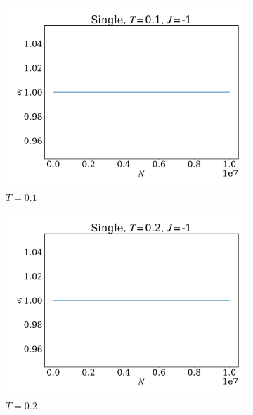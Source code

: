 \documentclass[12pt]{article}
\begin{document}
\begin{figure}
	\centering
	\begin{subfigure}[b]{0.49\textwidth}
		\centering
		\includegraphics[width=\textwidth]{fig1DJ1N1e7/sig_s_T0.1J-1.pdf}
		\caption{$T=0.1$}
	\end{subfigure}
	\hfill
	\begin{subfigure}[b]{0.49\textwidth}
		\centering
		\includegraphics[width=\textwidth]{fig1DJ1N1e7/sig_s_T0.2J-1.pdf}
		\caption{$T=0.2$}
	\end{subfigure}
	\hfill
	\begin{subfigure}[b]{0.49\textwidth}
		\centering

\end{subfigure}
\end{figure}
\end{document}
